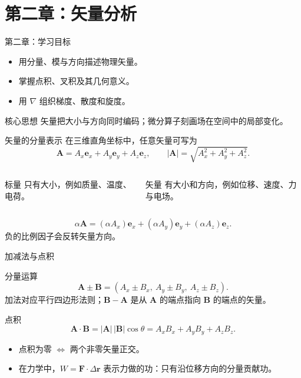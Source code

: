 \section{第二章：矢量分析}

\begin{frame}{第二章：学习目标}
  \begin{itemize}
    \item 用分量、模与方向描述物理矢量。
    \item 掌握点积、叉积及其几何意义。
    \item 用 $\nabla$ 组织梯度、散度和旋度。
  \end{itemize}
  \begin{block}{核心思想}
    矢量把大小与方向同时编码；微分算子刻画场在空间中的局部变化。
  \end{block}
\end{frame}

\begin{frame}{矢量的分量表示}
  在三维直角坐标中，任意矢量可写为
  \[
    \mathbf{A}=A_x\mathbf{e}_x+A_y\mathbf{e}_y+A_z\mathbf{e}_z,
    \qquad
    |\mathbf{A}|=\sqrt{A_x^2+A_y^2+A_z^2}.
  \]
  \begin{columns}[T]
    \begin{block}{标量}
      只有大小，例如质量、温度、电荷。
    \end{block}
    \begin{block}{矢量}
      有大小和方向，例如位移、速度、力与电场。
    \end{block}
  \end{columns}
  \[
    \alpha\mathbf{A}=(\alpha A_x)\mathbf{e}_x+(\alpha A_y)\mathbf{e}_y+(\alpha A_z)\mathbf{e}_z.
  \]
  负的比例因子会反转矢量方向。
\end{frame}

\begin{frame}{加减法与点积}
  \begin{block}{分量运算}
    \[
      \mathbf{A}\pm\mathbf{B}=(A_x\pm B_x,\ A_y\pm B_y,\ A_z\pm B_z).
    \]
    加法对应平行四边形法则；$\mathbf{B}-\mathbf{A}$ 是从 $\mathbf{A}$ 的端点指向 $\mathbf{B}$ 的端点的矢量。
  \end{block}
  \begin{block}{点积}
    \[
      \mathbf{A}\cdot\mathbf{B}=|\mathbf{A}|\,|\mathbf{B}|\cos\theta
      =A_xB_x+A_yB_y+A_zB_z.
    \]
  \end{block}
  \begin{itemize}
    \item 点积为零 $\Longleftrightarrow$ 两个非零矢量正交。
    \item 在力学中，$W=\mathbf{F}\cdot\Delta\mathbf{r}$ 表示力做的功：只有沿位移方向的分量贡献功。
  \end{itemize}
\end{frame}


